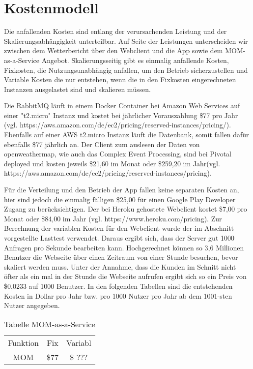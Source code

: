 \section{Kostenmodell}
Die anfallenden Kosten sind entlang der verursachenden Leistung und der Skalierungsabhängigkeit unterteilbar. Auf Seite der Leistungen unterscheiden wir zwischen dem Wetterbericht über den Webclient und die App sowie dem MOM-as-a-Service Angebot. Skalierungsseitig gibt es einmalig anfallende Kosten, Fixkosten, die Nutzungsunabhängig anfallen, um den Betrieb sicherzustellen und Variable Kosten die nur entstehen, wenn die in den Fixkosten eingerechneten Instanzen ausgelastet sind und skalieren müssen.

Die RabbitMQ läuft in einem Docker Container bei Amazon Web Services auf einer "t2.micro" Instanz und kostet bei jährlicher Vorauszahlung \$77 pro Jahr (vgl. https://aws.amazon.com/de/ec2/pricing/reserved-instances/pricing/). Ebenfalls auf einer AWS t2.micro Instanz läuft die Datenbank, somit fallen dafür ebenfalls \$77 jährlich an. Der Client zum auslesen der Daten von openweathermap, wie auch das Complex Event Processing, sind bei Pivotal deployed und kosten jeweils \$21,60 im Monat oder \$259,20 im Jahr(vgl. https://aws.amazon.com/de/ec2/pricing/reserved-instances/pricing). 


Für die Verteilung und den Betrieb der App fallen keine separaten Kosten an, hier sind jedoch die einmalig fälligen \$25,00 für einen Google Play Developer Zugang zu berücksichtigen. Der bei Heroku gehostete Webclient kostet \$7,00 pro Monat oder \$84,00 im Jahr (vgl. https://www.heroku.com/pricing). Zur Berechnung der variablen Kosten für den Webclient wurde der im Abschnitt  vorgestellte Lasttest verwendet. Daraus ergibt sich, dass der Server gut 1000 Anfragen pro Sekunde bearbeiten kann. Hochgerechnet können so 3,6 Millionen Benutzer die Webseite über einen Zeitraum von einer Stunde besuchen, bevor skaliert werden muss. Unter der Annahme, dass die Kunden im Schnitt nicht öfter als ein mal in der Stunde die Webseite aufrufen ergibt sich so ein Preis von \$0,0233 auf 1000 Benutzer. In den folgenden Tabellen sind die entstehenden Kosten in Dollar pro Jahr bzw. pro 1000 Nutzer pro Jahr ab dem 1001-sten Nutzer angegeben.

\begin{table}
\caption{Tabelle MOM-as-a-Service}
\centering
\begin{tabular}{ccc}
	Funktion & Fix & Variabl \\
	MOM & \$77 & \$ ??? \\
\end{tabular}
\end{table}

